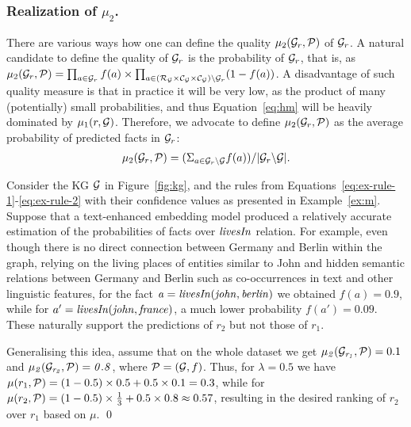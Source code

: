\subsubsection{Realization of $\mu_2$.}
There are various ways how one can define the quality $\mu_2(\mathcal{G}_r,\mathcal{P})$ of $\mathcal{G}_r$.
A natural candidate to define the quality of $\mathcal{G}_r$ is the probability of $\mathcal{G}_r$, that is, as
$\mu_2(\mathcal{G}_r,\mathcal{P})=\prod_{a \in \mathcal{G}_r} f(a) \times \prod_{a \in (\mathcal{R}_\mathcal{G}\times\mathcal{C}_\mathcal{G}\times\mathcal{C}_\mathcal{G})\setminus \mathcal{G}_r} (1-f(a))$.
A disadvantage of such quality measure is that in practice it will be very low,
as the product of many (potentially) small probabilities,
and thus Equation~\ref{eq:hm} will be heavily dominated by $\mu_1(r,\mathcal{G})$. Therefore,
we advocate 
to define $\mu_2(\mathcal{G}_r,\mathcal{P})$ as 
the average probability of predicted facts in $\mathcal{G}_r$:
\begin{align*}
	\mu_2(\mathcal{G}_r,\mathcal{P}) = (\Sigma_{a\in \mathcal{G}_r\backslash \mathcal{G}} f(a)) /
				|\mathcal{G}_r \backslash \mathcal{G}|.
\end{align*}

\begin{example}\label{ex:hm}
Consider the KG $\mathcal{G}$ in Figure~\ref{fig:kg}, and the rules from Equations~\eqref{eq:ex-rule-1}-\eqref{eq:ex-rule-2} with their confidence values as presented in Example~\ref{ex:m}. Suppose that a text-enhanced embedding model produced a relatively accurate estimation of the probabilities of facts over $\mathit{livesIn}$ relation. For example, even though there is no direct connection between Germany and Berlin within the graph, relying on the living places of entities similar to John and hidden semantic relations between Germany and Berlin such as co-occurrences in text and other linguistic features, for the fact $\mathit{a=livesIn(john,berlin)}$ we obtained $f(a)=0.9$, while for $a'=\mathit{livesIn(john,france)}$, a much lower probability $f(a')=0.09$. These naturally support the predictions of $r_2$ but not those of $r_1$.

Generalising this idea, assume that on the whole dataset we get $\mathit{\mu_2(\mathcal{G}_{r_1},\mathcal{P})}=0.1$ and $\mathit{\mu_2(\mathcal{G}_{r_2},\mathcal{P})=0.8}$, where $\mathcal{P}=(\mathcal{G},f)$. Thus, for $\lambda=0.5$ we have $\mu(r_1,\mathcal{P})=(1-0.5)\times 0.5+0.5\times 0.1 = 0.3$, while for $\mu(r_2,\mathcal{P})=(1-0.5) \times \frac{1}{3}+0.5\times 0.8\approx 0.57$, resulting in the desired ranking of $r_2$ over $r_1$ based on $\mu$.
\qed 
\end{example}




